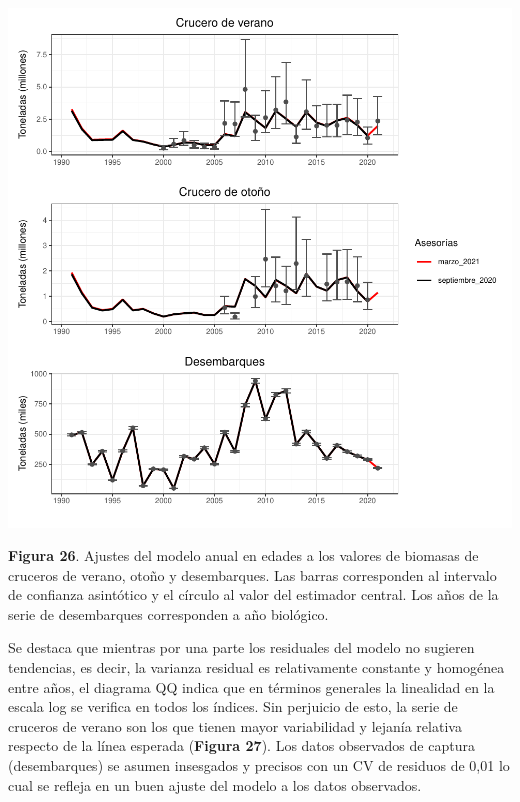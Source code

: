 \documentclass[
  spanish,
]{article}
\begin{document}
\begin{center}\includegraphics{FigurasInforme_Marzo/Fig26_Ajustes_indices-1} \end{center}

\vspace{-0.5cm}
\small

\textbf{Figura 26}. Ajustes del modelo anual en edades a los valores de
biomasas de cruceros de verano, otoño y desembarques. Las barras
corresponden al intervalo de confianza asintótico y el círculo al valor
del estimador central. Los años de la serie de desembarques corresponden
a año biológico. \vspace{0.5cm} \normalsize

Se destaca que mientras por una parte los residuales del modelo no
sugieren tendencias, es decir, la varianza residual es relativamente
constante y homogénea entre años, el diagrama QQ indica que en términos
generales la linealidad en la escala log se verifica en todos los
índices. Sin perjuicio de esto, la serie de cruceros de verano son los
que tienen mayor variabilidad y lejanía relativa respecto de la línea
esperada (\textbf{Figura 27}). Los datos observados de captura
(desembarques) se asumen insesgados y precisos con un CV de residuos de
0,01 lo cual se refleja en un buen ajuste del modelo a los datos
observados.
\end{document}
